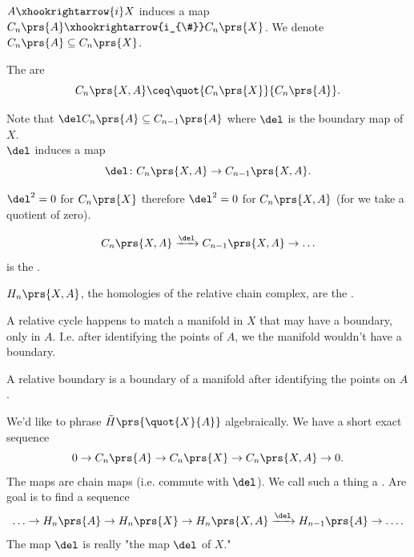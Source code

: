 \documentclass[10pt,a4paper,twoside,openany,hidelinks]{book}
\begin{document}
\begin{remark}
$A \xhookrightarrow{i} X$ induces a map $C_n\prs{A} \xhookrightarrow{i_{\#}} C_n\prs{X}$. We denote $C_n\prs{A} \subseteq C_n\prs{X}$.
\end{remark}
\begin{definition}
The  are
\[C_n\prs{X,A} \ceq \quot{C_n\prs{X}}{C_n\prs{A}}\text{.}\]
\end{definition}
\begin{remark}
Note that $\del C_n\prs{A} \subseteq C_{n-1}\prs{A}$ where $\del$ is the boundary map of $X$.\\
$\del$ induces a map
\[\del \colon C_n\prs{X, A} \to C_{n-1} \prs{X,A}\text{.}\]
\end{remark}
\begin{remark}
$\del^2 = 0$ for $C_n\prs{X}$ therefore $\del^2 = 0$ for $C_n\prs{X,A}$ (for we take a quotient of zero).
\end{remark}
\begin{definition}
\[C_n\prs{X,A} \xrightarrow{\del} C_{n-1}\prs{X,A} \to \ldots\]
is the .
\end{definition}
\begin{definition}
$H_n\prs{X,A}$, the homologies of the relative chain complex, are the .
\end{definition}
\begin{example}
A relative cycle happens to match a manifold in $X$ that may have a boundary, only in $A$. I.e. after identifying the points of $A$, we the manifold wouldn't have a boundary. %
\end{example}
\begin{example}
A relative boundary is a boundary of a manifold after identifying the points on $A$. %
\end{example}

We'd like to phrase $\tilde{H}\prs{\quot{X}{A}}$ algebraically.
We have a short exact sequence
\[0 \to C_n\prs{A} \to C_n\prs{X} \to C_n\prs{X,A} \to 0\text{.}\]
The maps are chain maps (i.e. commute with $\del$).
We call such a thing a .
Are goal is to find a sequence
\[\ldots \to H_n\prs{A} \to H_n\prs{X} \to H_n\prs{X,A} \xrightarrow{\del} H_{n-1} \prs{A} \to \ldots\text{.}\]
The map $\del$ is really "the map $\del$ of $X$."
\end{document}
